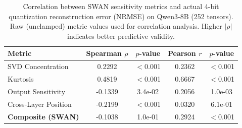 \begin{table}[t]
\centering
\caption{Correlation between SWAN sensitivity metrics and actual 4-bit quantization reconstruction error (NRMSE) on Qwen3-8B (252 tensors). Raw (unclamped) metric values used for correlation analysis. Higher $|\rho|$ indicates better predictive validity.}
\label{tab:correlation}
\begin{tabular}{lcccc}
\toprule
Metric & Spearman $\rho$ & $p$-value & Pearson $r$ & $p$-value \\
\midrule
  SVD Concentration & 0.2292 & $<$0.001 & 0.2362 & $<$0.001 \\
  Kurtosis & 0.4819 & $<$0.001 & 0.6667 & $<$0.001 \\
  Output Sensitivity & -0.1339 & 3.4e-02 & 0.2056 & 1.0e-03 \\
  Cross-Layer Position & -0.2199 & $<$0.001 & 0.0320 & 6.1e-01 \\
\midrule
  \textbf{Composite (SWAN)} & -0.1038 & 1.0e-01 & 0.2924 & $<$0.001 \\
\bottomrule
\end{tabular}
\end{table}